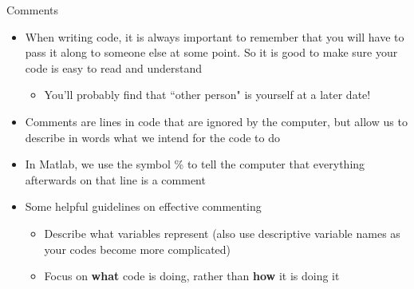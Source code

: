{}\documentclass[letterpaper,
compress,
xcolor=x11names,
]{beamer}
\begin{document}
\begin{frame}{Comments}
	\footnotesize
	\begin{itemize}
		\item When writing code, it is always important to remember that you will have to pass it along to someone else at some point. So it is good to make sure your code is easy to read and understand
		\begin{itemize}
			\item You'll probably find that ``other person" is yourself at a later date!
		\end{itemize}
		\item<2-> Comments are lines in code that are ignored by the computer, but allow us to describe in words what we intend for the code to do
		\item<2-> In Matlab, we use the symbol \% to tell the computer that everything afterwards on that line is a comment
		\item<3-> Some helpful guidelines on effective commenting
		\begin{itemize}
			\item Describe what variables represent (also use descriptive variable names as your codes become more complicated)
			\item Focus on \textbf{what} code is doing, rather than \textbf{how} it is doing it
		\end{itemize}
	\end{itemize}
\end{frame}
\end{document}
